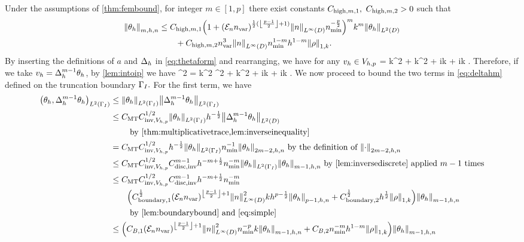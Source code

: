 \label{lem:higherbound}
Under the assumptions of \cref{thm:fembound}, for integer $m \in [1,p]$ there exist constants $C_{\mathrm{high},m,1},$ $C_{\mathrm{high},m,2} > 0$ such that
\begin{align}
\Nfn{m,h,n}{\thetah} &\leq \Chighmo \mleft(1+\mleft(\En\nvar\mright)^{\half(\floor{\frac{p-1}2}+1)}\NLiD{n}\nmin^{-\frac{p}2}\mright)^mk^m \NLtD{\thetah}\nonumber\\
&\quad\quad+ \Chighmt \nvar^3\NLiD{n}\nmin^{1-m} h^{1-m} \NW{\rho}.\label{eq:chigh}
\end{align}
\ele
{}
By inserting the definitions of $a$ and $\Delta_{h}$ in \cref{eq:thetaform} and rearranging, we have for any $v_{h} \in V_{h,p}$
\beqs
\IPLtDn{\Deltah \thetah}{\vh} = k^2 \IPLtDn{\thetah}{\vh} + k^2\IPLtDn{\Qhn \rho}{\vh} + ik \IPLtGI{\thetah}{\vh} + ik \IPLtGI{\rho}{\vh}.
\eeqs
Therefore, if we take $v_{h} = \Delta_{h}^{m-1}\theta_{h}$, by \cref{lem:intoip} we have
\beq\label{eq:deltahm}
^2 = k^2 ^2 + k^2  + ik + ik .
\eeq
We now proceed to bound the two terms in \cref{eq:deltahm} defined on the truncation boundary $\Gamma_{I}.$ For the first term, we have
\begin{align}
\IPLtGI{\thetah}{\Deltah^{m-1}\thetah} &\leq \NLtGI{\thetah}\NLtGI{\Deltah^{m-1}\thetah}\nonumber\\
&\leq \CMT \CinvVhp^{1/2} \NLtGI{\thetah} h^{-\half} \NLtD{\Deltah^{m-1} \thetah}\nonumber\\
&\quad\quad\text{ by \cref{thm:multiplicativetrace,lem:inverseinequality}}\nonumber\\
&= \CMT \CinvVhp^{1/2} h^{-\half}\NLtGI{\thetah}\nmin^{-1}\Nfn{2m-2,h,n}{\thetah}\text{ by the definition of }\Nfn{2m-2,h,n}{\cdot}\nonumber\\
&\leq \CMT \CinvVhp^{1/2} \Chinv^{m-1} h^{-m+\half} \nmin^{-m} \NLtGI{\thetah}\Nfn{m-1,h,n}{\thetah} \text{ by \cref{lem:inversediscrete} applied } m-1 \text{ times}\label{eq:useitagain}\\
&\leq \CMT \CinvVhp^{1/2} \Chinv^{m-1} h^{-m+\half} \nmin^{-m}\nonumber\\
&\quad\quad\mleft(\Cboundaryo^{\half} \mleft(\En\nvar\mright)^{\floor{\frac{p-1}2}+1}\NLiD{n}^2 k h^{p-\half} \Nfn{p-1,h,n}{\thetah} + \Cboundaryt^{\half} h^{\half} \NW{\rho}\mright)\Nfn{m-1,h,n}{\thetah}\nonumber\\
&\quad\quad\text{ by \cref{lem:boundarybound} and \cref{eq:simple}}\nonumber\\
&\leq \mleft(\CBo \mleft(\En\nvar\mright)^{\floor{\frac{p-1}2}+1}\NLiD{n}^2\nmin^{-p}k \Nfn{m-1,h,n}{\thetah} + \CBt \nmin^{-m}h^{1-m} \NW{\rho}\mright)\Nfn{m-1,h,n}{\thetah}\label{eq:firstboundary}
\end{align}
